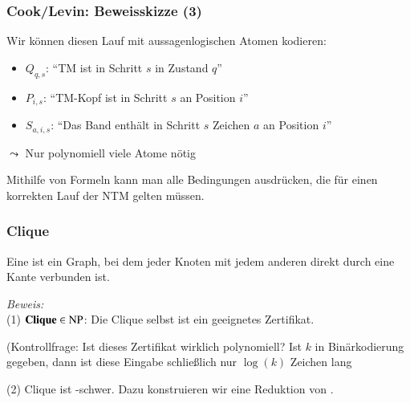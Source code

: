 \documentclass[aspectratio=1610,onlymath]{beamer}
\begin{document}
\begin{frame}\frametitle{Cook/Levin: Beweisskizze (3)}

Wir können diesen Lauf mit aussagenlogischen Atomen kodieren:
\begin{itemize}
\item $Q_{q,s}$: "`TM ist in Schritt $s$ in Zustand $q$"'
% 
\item $P_{i,s}$: "`TM-Kopf ist in Schritt $s$ an Position $i$"'
\item $S_{a,i,s}$: "`Das Band enthält in Schritt $s$ Zeichen $a$ an Position $i$"'
\end{itemize}
$\leadsto$ Nur polynomiell viele Atome nötig
\bigskip

Mithilfe von Formeln kann man alle Bedingungen ausdrücken, die für einen korrekten Lauf der NTM gelten müssen.

\medskip



\end{frame}



\begin{frame}\frametitle{Clique}

Eine  ist ein Graph, bei dem jeder Knoten mit jedem anderen
direkt durch eine Kante verbunden ist.\medskip

\medskip\pause

\pause

\emph{Beweis:}\\
(1) $\textbf{\textcolor{black}{Clique}}\in{\textsc{NP}}$: Die Clique selbst ist ein geeignetes Zertifikat.\\[1ex] {\tiny(Kontrollfrage: Ist dieses Zertifikat wirklich polynomiell? Ist $k$ in Binärkodierung gegeben, dann ist diese Eingabe schließlich nur $\log(k)$ Zeichen lang \ghost{\ldots)}\pause

}\medskip

(2) Clique ist -schwer. Dazu konstruieren wir eine Reduktion \alert{von} .

\end{frame}
\end{document}
